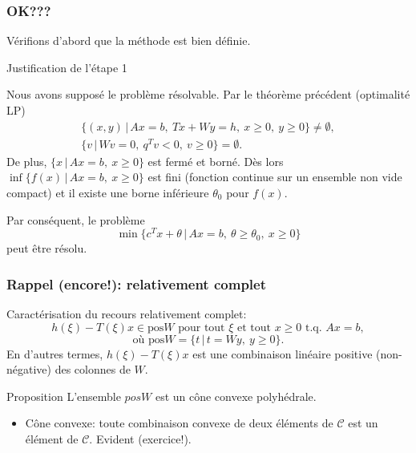 
\begin{frame}
	\frametitle{OK???}
	
	Vérifions d'abord que la méthode est bien définie.
	
	\mbox{}
	
	{\red Justification de l'étape 1}
	
	\mbox{}
	
	Nous avons supposé le problème résolvable. Par le théorème précédent
	(optimalité LP)
	\begin{align*}
		\lbrace (x,y) \,|\, Ax = b,\ Tx+Wy = h,\ x \geq 0,\ y \geq 0\rbrace \ne
		\emptyset,\\
		\lbrace v \,|\, Wv = 0,\ q^Tv < 0,\ v \geq 0 \rbrace = \emptyset.
	\end{align*}
	De plus, $\lbrace x \,|\, Ax = b,\ x \geq 0 \rbrace$ est fermé et
	borné. Dès lors
	$\inf \lbrace f(x) \,|\, Ax = b,\ x \geq 0 \rbrace$ est fini (fonction
	continue sur un ensemble non vide compact) et il
	existe une borne inférieure $\theta_0$ pour $f(x)$.
	
	Par conséquent, le problème
	\[
	\min \lbrace c^Tx + \theta \,|\, Ax = b,\ \theta \geq \theta_0,\ x
	\geq 0 \rbrace
	\]
	peut être résolu.
	
\end{frame}

\begin{frame}
	\frametitle{Rappel (encore!): relativement complet}
	
	Caractérisation du recours relativement complet:
	\[
	h(\xi) - T(\xi)x \in \mbox{pos}W \mbox{ pour tout } \xi \mbox{ et tout
	}x \geq 0 \mbox{ t.q. } Ax=b,
	\]
	\[
	\mbox{où pos}W = \lbrace t \,|\, t = Wy,\ y \geq 0 \rbrace.
	\]
	En d'autres termes, $h(\xi) - T(\xi)x$ est une combinaison linéaire
	positive (non-négative) des colonnes de $W$.
	
	\begin{block}{Proposition}
		L'ensemble $pos W$
		est un cône convexe polyhédrale.
	\end{block}
	
	\begin{itemize}
		\item
		Cône convexe: toute combinaison convexe de deux éléments de
		$\mathcal{C}$ est un élément de $\mathcal{C}$. Evident (exercice!).
	\end{itemize}
	
	
\end{frame}

